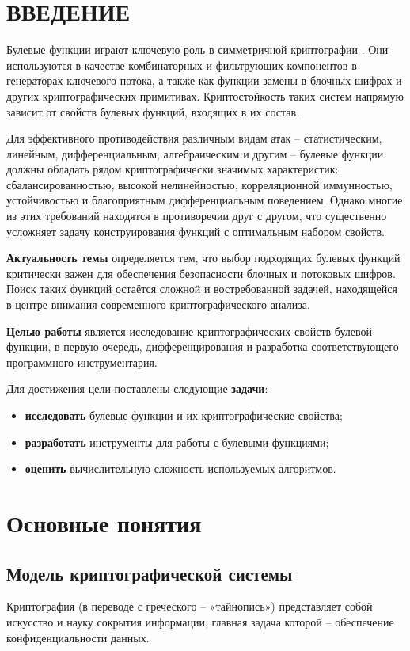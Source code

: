 \section*{ВВЕДЕНИЕ}
Булевые функции играют ключевую роль в симметричной криптографии \cite{Karle}. Они используются в качестве комбинаторных и фильтрующих компонентов в генераторах ключевого потока, а также как функции замены в блочных шифрах и других криптографических примитивах. Криптостойкость таких систем напрямую зависит от свойств булевых функций, входящих в их состав.

Для эффективного противодействия различным видам атак – статистическим, линейным, дифференциальным, алгебраическим и другим – булевые функции должны обладать рядом криптографически значимых характеристик: сбалансированностью, высокой нелинейностью, корреляционной иммунностью, устойчивостью и благоприятным дифференциальным поведением. Однако многие из этих требований находятся в противоречии друг с другом, что существенно усложняет задачу конструирования функций с оптимальным набором свойств.

\textbf{Актуальность темы} определяется тем, что выбор подходящих булевых функций критически важен для обеспечения безопасности блочных и потоковых шифров. Поиск таких функций остаётся сложной и востребованной задачей, находящейся в центре внимания современного криптографического анализа.

\textbf{Целью работы}  является исследование криптографических свойств булевой функции, в первую очередь, дифференцирования и разработка соответствующего программного инструментария.

Для достижения цели поставлены следующие \textbf{задачи}:
\begin{itemize}
    \item \textbf{исследовать} булевые функции и их криптографические свойства;
    \item \textbf{разработать} инструменты для работы с булевыми функциями;
    \item \textbf{оценить} вычислительную сложность используемых алгоритмов.
\end{itemize}
\section{Основные понятия}
\subsection{Модель криптографической системы}
Криптография (в переводе с греческого – «тайнопись») представляет собой искусство и науку сокрытия информации, главная задача которой  – обеспечение конфиденциальности данных.

